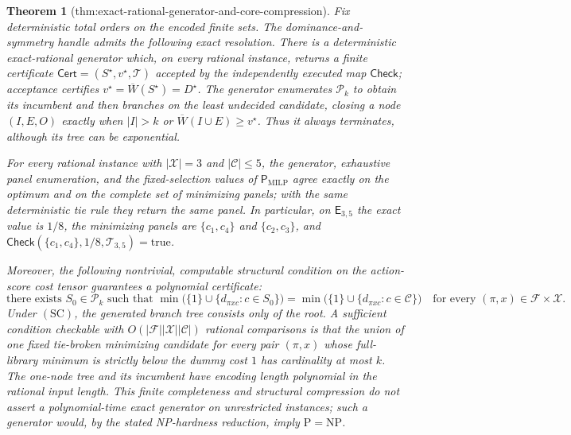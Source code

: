 \documentclass{article}
\newtheorem{theorem}{Theorem}
\begin{document}
\begin{theorem}[thm:exact-rational-generator-and-core-compression]\label{thm:exact-rational-generator-and-core-compression}
Fix deterministic total orders on the encoded finite sets.  The dominance-and-symmetry handle admits the following exact resolution.  There is a deterministic exact-rational generator which, on every rational instance, returns a finite certificate \(\mathsf{Cert}=(S^{\star},v^{\star},\mathcal T)\) accepted by the independently executed map \(\mathsf{Check}\); acceptance certifies \(v^{\star}=\overline W(S^{\star})=D^{\star}\).  The generator enumerates \(\mathcal P_k\) to obtain its incumbent and then branches on the least undecided candidate, closing a node \((I,E,O)\) exactly when \(|I|>k\) or \(\overline W(I\cup E)\geq v^{\star}\).  Thus it always terminates, although its tree can be exponential.

For every rational instance with \(|\mathcal X|=3\) and \(|\mathcal C|\leq5\), the generator, exhaustive panel enumeration, and the fixed-selection values of \(\mathsf P_{\mathrm{MILP}}\) agree exactly on the optimum and on the complete set of minimizing panels; with the same deterministic tie rule they return the same panel.  In particular, on \(\mathsf E_{3,5}\) the exact value is \(1/8\), the minimizing panels are \(\{c_1,c_4\}\) and \(\{c_2,c_3\}\), and \(\mathsf{Check}(\{c_1,c_4\},1/8,\mathcal T_{3,5})=\mathrm{true}\).

Moreover, the following nontrivial, computable structural condition on the action-score cost tensor guarantees a polynomial certificate:
\[
 \text{there exists }S_0\in\mathcal P_k\text{ such that }
 \min\bigl(\{1\}\cup\{d_{\pi xc}:c\in S_0\}\bigr)
 =\min\bigl(\{1\}\cup\{d_{\pi xc}:c\in\mathcal C\}\bigr)
 \quad\text{for every }(\pi,x)\in\mathcal F\times\mathcal X. \tag{SC}
\]
Under \(\mathrm{(SC)}\), the generated branch tree consists only of the root.  A sufficient condition checkable with \(O(|\mathcal F||\mathcal X||\mathcal C|)\) rational comparisons is that the union of one fixed tie-broken minimizing candidate for every pair \((\pi,x)\) whose full-library minimum is strictly below the dummy cost \(1\) has cardinality at most \(k\).  The one-node tree and its incumbent have encoding length polynomial in the rational input length.  This finite completeness and structural compression do not assert a polynomial-time exact generator on unrestricted instances; such a generator would, by the stated NP-hardness reduction, imply \(\mathrm P=\mathrm{NP}\).
\end{theorem}
\end{document}
